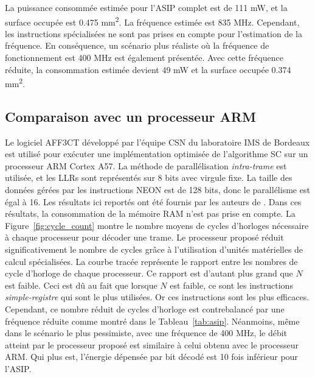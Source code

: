 La puissance consommée estimée pour l'ASIP complet est de 111 mW, et la surface occupée est 0.475 mm\textsuperscript{2}. La fréquence estimée est 835 MHz. Cependant, les instructions spécialisées ne sont pas prises en compte pour l'estimation de la fréquence. En conséquence, un scénario plus réaliste où la fréquence de fonctionnement est 400 MHz est également présentée. Avec cette fréquence réduite, la consommation estimée devient 49 mW et la surface occupée 0.374 mm\textsuperscript{2}.

\subsection{Comparaison avec un processeur ARM}

Le logiciel AFF3CT développé par l'équipe CSN du laboratoire IMS de Bordeaux est utilisé pour exécuter une implémentation optimisée de l'algorithme SC sur un processeur ARM Cortex A57. La méthode de parallélisation \textit{intra-trame} est utilisée, et les LLRs sont représentés sur 8 bits avec virgule fixe. La taille des données gérées par les instructions NEON est de 128 bits, donc le parallélisme est égal à 16. Les résultats ici reportés ont été fournis par les auteurs de \cite{cassagne_energy_2016}. Dans ces résultats, la consommation de la mémoire RAM n'est pas prise en compte.
La Figure~\ref{fig:cycle_count} montre le nombre moyens de cycles d'horloges nécessaire à chaque processeur pour décoder une trame. Le processeur proposé réduit significativement le nombre de cycles grâce à l'utilisation d'unités matérielles de calcul spécialisées. La courbe tracée représente le rapport entre les nombres de cycle d'horloge de chaque processeur. Ce rapport est d'autant plus grand que $N$ est faible. Ceci est dû au fait que lorsque $N$ est faible, ce sont les instructions \textit{simple-registre} qui sont le plus utilisées. Or ces instructions sont les plus efficaces.
Cependant, ce nombre réduit de cycles d'horloge est contrebalancé par une fréquence réduite comme montré dans le Tableau~\ref{tab:asip}. Néanmoins, même dans le scénario le plus pessimiste, avec une fréquence de 400 MHz, le débit atteint par le processeur proposé est similaire à celui obtenu avec le processeur ARM. Qui plus est, l'énergie dépensée par bit décodé est 10 fois inférieur pour l'ASIP.
